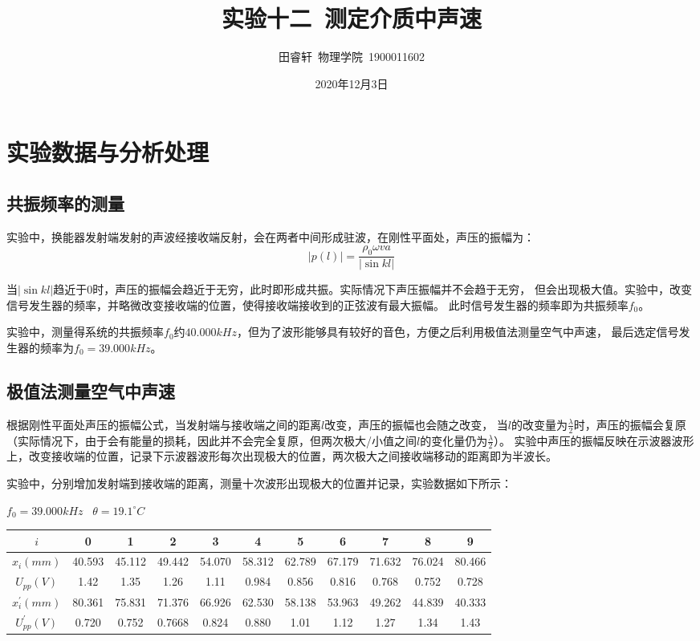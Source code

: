 \documentclass{article}
\title{\heiti 实验十二\ 测定介质中声速}
\author{\kaishu 田睿轩\ 物理学院\ 1900011602}
\date{2020年12月3日}
\newcommand{\degree}{^\circ}
\begin{document}
    \maketitle
    \section{实验数据与分析处理}
    \subsection{共振频率的测量}
    实验中，换能器发射端发射的声波经接收端反射，会在两者中间形成驻波，在刚性平面处，声压的振幅为：
    $$|p(l)|=\frac{\rho_0 \omega v a}{|\sin kl|}$$

    当$|\sin kl|$趋近于0时，声压的振幅会趋近于无穷，此时即形成共振。实际情况下声压振幅并不会趋于无穷，
    但会出现极大值。实验中，改变信号发生器的频率，并略微改变接收端的位置，使得接收端接收到的正弦波有最大振幅。
    此时信号发生器的频率即为共振频率$f_0$。

    实验中，测量得系统的共振频率$f_0$约$40.000kHz$，但为了波形能够具有较好的音色，方便之后利用极值法测量空气中声速，
    最后选定信号发生器的频率为$f_0=39.000kHz$。
   
    \subsection{极值法测量空气中声速}
    根据刚性平面处声压的振幅公式，当发射端与接收端之间的距离$l$改变，声压的振幅也会随之改变，
    当$l$的改变量为$\frac{\lambda}{2}$时，声压的振幅会复原（实际情况下，由于会有能量的损耗，因此并不会完全复原，但两次极大/小值之间$l$的变化量仍为$\frac{\lambda}{2}$）。
    实验中声压的振幅反映在示波器波形上，改变接收端的位置，记录下示波器波形每次出现极大的位置，两次极大之间接收端移动的距离即为半波长。

    实验中，分别增加发射端到接收端的距离，测量十次波形出现极大的位置并记录，实验数据如下所示：

    $f_0=39.000kHz$ \   $\theta = 19.1\degree C$
    \begin{center}
        \begin{tabular}{|c|c|c|c|c|c|c|c|c|c|c|}
            \hline
            $i$ & 0 & 1 & 2 & 3 & 4 & 5 & 6 & 7 & 8 & 9 \\
            \hline
            $x_i(mm)$ & 40.593 & 45.112 & 49.442 & 54.070 & 58.312 & 62.789 & 67.179 & 71.632 & 76.024 & 80.466 \\
            \hline 
            $U_{pp}(V)$  & 1.42 & 1.35 & 1.26 & 1.11 & 0.984 & 0.856 & 0.816 & 0.768 & 0.752 & 0.728 \\
            \hline
            $x_i^{'}(mm)$ & 80.361 & 75.831 & 71.376 & 66.926 & 62.530 & 58.138 & 53.963 & 49.262 & 44.839 & 40.333 \\
            \hline
            $U_{pp}^{'}(V)$ & 0.720 & 0.752 & 0.7668 & 0.824 & 0.880 & 1.01 & 1.12 & 1.27 & 1.34 & 1.43 \\
            \hline
        \end{tabular}
    \end{center}
    
\end{document}
